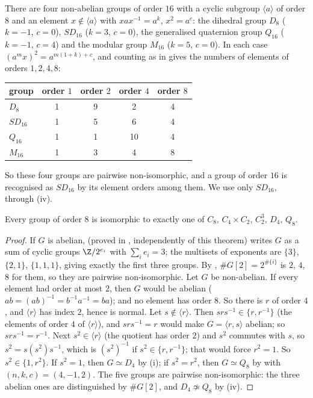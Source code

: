 \begin{remark}\label{rem:groups:order16}
There are four non-abelian groups of order $16$ with a cyclic subgroup $\langle a\rangle$ of order $8$ and an element $x\notin\langle a\rangle$ with $xax^{-1}=a^k$,
$x^2=a^c$: the dihedral group $D_8$ ($k=-1$, $c=0$), $SD_{16}$ ($k=3$, $c=0$), the generalised quaternion group $Q_{16}$ ($k=-1$, $c=4$) and the
modular group $M_{16}$ ($k=5$, $c=0$). In each case $(a^mx)^2=a^{m(1+k)+c}$, and counting as in  gives the numbers of
elements of orders $1,2,4,8$:
\begin{center}
\begin{tabular}{lcccc}
\toprule
group & order $1$ & order $2$ & order $4$ & order $8$\\
\midrule
$D_8$ & 1 & 9 & 2 & 4\\
$SD_{16}$ & 1 & 5 & 6 & 4\\
$Q_{16}$ & 1 & 1 & 10 & 4\\
$M_{16}$ & 1 & 3 & 4 & 8\\
\bottomrule
\end{tabular}
\end{center}
So these four groups are pairwise non-isomorphic, and a group of order $16$ is recognised as $SD_{16}$ by its element orders among them.
We use only $SD_{16}$, through (iv).
\end{remark}

\begin{theorem}\label{thm:groups:order8}
Every group of order $8$ is isomorphic to exactly one of $C_8$, $C_4\times C_2$, $C_2^3$, $D_4$, $Q_8$.
\end{theorem}

\begin{proof}
If $G$ is abelian,  (proved in , independently of this theorem) writes $G$ as a sum of
cyclic groups $\Z/2^{e_i}$ with $\sum_ie_i=3$; the multisets of exponents are $\{3\}$, $\{2,1\}$, $\{1,1,1\}$, giving exactly the first three groups. By
, $\#G[2]=2^{\#\{i\}}$ is $2$, $4$, $8$ for them, so they are pairwise non-isomorphic. Let $G$ be non-abelian. If every
element had order at most $2$, then $G$ would be abelian ($ab=(ab)^{-1}=b^{-1}a^{-1}=ba$); and no element has order $8$. So there is $r$ of order $4$,
and $\langle r\rangle$ has index $2$, hence is normal. Let $s\notin\langle r\rangle$. Then $srs^{-1}\in\{r,r^{-1}\}$ (the elements of order $4$ of $\langle r\rangle$), and
$srs^{-1}=r$ would make $G=\langle r,s\rangle$ abelian; so $srs^{-1}=r^{-1}$. Next $s^2\in\langle r\rangle$ (the quotient has order $2$) and $s^2$ commutes with $s$, so
$s^2=s(s^2)s^{-1}$, which is $(s^2)^{-1}$ if $s^2\in\{r,r^{-1}\}$; that would force $r^2=1$. So $s^2\in\{1,r^2\}$. If $s^2=1$, then $G\simeq D_4$ by
(i); if $s^2=r^2$, then $G\simeq Q_8$ by  with $(n,k,c)=(4,-1,2)$. The five groups are pairwise
non-isomorphic: the three abelian ones are distinguished by $\#G[2]$, and $D_4\not\simeq Q_8$ by (iv).
\end{proof}

